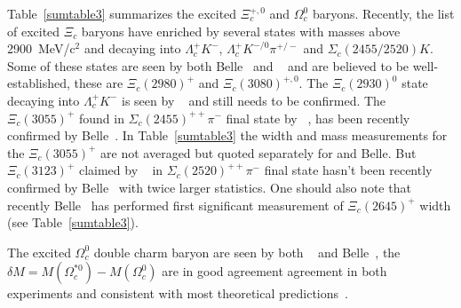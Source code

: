 Table~\ref{sumtable3} summarizes the excited $\Xi_c^{+,0}$ and $\Omega_c^0$ 
baryons. Recently, the list of excited $\Xi_c$ baryons have enriched by 
several states with masses above 2900~MeV/c$^2$ and decaying into 
$\Lambda_c^+ K^-$, $\Lambda_c^+ K^{-/0}\pi^{+/-}$ and $\Sigma_c(2455/2520) K$. 
Some of these states are seen by both Belle~\cite{Chistov:2006zj,YKato:2014} 
and \babar~\cite{Aubert:2007dt} and are believed to be well-established, 
these are $\Xi_c(2980)^+$ and $\Xi_c(3080)^{+,0}$. 
The $\Xi_c(2930)^0$ state decaying into 
$\Lambda_c^+ K^-$ is seen by \babar~\cite{Aubert:2008cb} 
and still needs to be confirmed.  
The $\Xi_c(3055)^+$ found in $\Sigma_c(2455)^{++}\pi^-$ final state by \babar~\cite{Aubert:2007dt}, 
has been recently confirmed by Belle~\cite{YKato:2014}. 
In Table~\ref{sumtable3} the width and mass measurements for the $\Xi_c(3055)^+$ 
are not averaged but quoted separately for \babar and Belle. 
But $\Xi_c(3123)^+$ claimed by \babar~\cite{Aubert:2007dt} in 
$\Sigma_c(2520)^{++}\pi^-$ final state hasn't been recently
confirmed by Belle~\cite{YKato:2014} with twice larger statistics.   
One should also note that recently Belle~\cite{YKato:2014} 
has performed first significant measurement of $\Xi_c(2645)^+$ width (see Table~\ref{sumtable3}). 




The excited $\Omega_c^0$ double charm baryon are seen by both 
\babar~\cite{Aubert:2006je} and Belle~\cite{Solovieva:2008fw}, the 
$\delta M=M(\Omega_c^{*0})-M(\Omega_c^0)$ are in good agreement 
agreement in both experiments and consistent with most theoretical 
predictions~\cite{Rosner:1995yu,Glozman:1995xy,Jenkins:1996de,
Burakovsky:1997vm}. 
   

